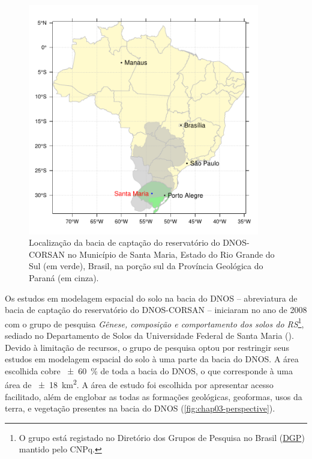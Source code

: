 \begin{figure}[!ht]
\centering
\includegraphics[width=0.90\textwidth]{fig/chap03-location}
\caption[Localização da bacia de captação do reservatório do DNOS-CORSAN, em Santa Maria, RS, 
Brasil]{Localização da bacia de captação do reservatório do DNOS-CORSAN no Município de Santa Maria, Estado do 
Rio Grande do Sul (em verde), Brasil, na porção sul da Província Geológica do Paraná (em cinza).}
\label{fig:chap03-location}
\end{figure}

\def\footsolosdors{\footnote{O grupo está registado no Diretório dos Grupos de Pesquisa no Brasil 
(\href{http://dgp.cnpq.br/dgp/espelhogrupo/9373361709890764}{DGP}) mantido pelo CNPq.}}

Os estudos em modelagem espacial do solo na bacia do DNOS -- abreviatura de bacia de captação do reservatório 
do DNOS-CORSAN -- iniciaram no ano de \num{2008} com o grupo de pesquisa \emph{Gênese, composição e 
comportamento dos solos do RS}\footsolosdors{}, sediado no Departamento de Solos da Universidade Federal de 
Santa Maria (\ufsm). Devido à limitação de recursos, o grupo de pesquisa optou por restringir seus estudos em 
modelagem espacial do solo à uma parte da bacia do DNOS. A área escolhida cobre \SI{\pm60}{\percent} de toda a 
bacia do DNOS, o que corresponde à uma área de \SI{\pm18}{\square\kilo\metre}. A área de estudo foi escolhida 
por apresentar acesso facilitado, além de englobar as todas as formações geológicas, geoformas, usos da terra, 
e vegetação presentes na bacia do DNOS (\autoref{fig:chap03-perspective}).


